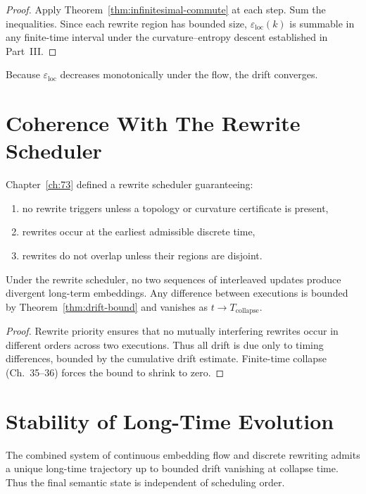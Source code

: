 \begin{proof}
Apply Theorem~\ref{thm:infinitesimal-commute} at each step.  
Sum the inequalities.  
Since each rewrite region has bounded size,  
$\varepsilon_{\mathrm{loc}}(k)$ is summable in any finite-time interval  
under the curvature–entropy descent established in Part~III.  
\end{proof}

Because $\varepsilon_{\mathrm{loc}}$ decreases monotonically under the flow,  
the drift converges.

\section{Coherence With The Rewrite Scheduler}

Chapter~\ref{ch:73} defined a rewrite scheduler guaranteeing:

\begin{enumerate}
\item no rewrite triggers unless a topology or curvature certificate is present,
\item rewrites occur at the earliest admissible discrete time,
\item rewrites do not overlap unless their regions are disjoint.
\end{enumerate}

\begin{theorem}
\label{thm:scheduler-consistency}
Under the rewrite scheduler,  
no two sequences of interleaved updates produce divergent long-term embeddings.  
Any difference between executions is bounded by Theorem~\ref{thm:drift-bound}
and vanishes as $t \to T_{\mathrm{collapse}}$.
\end{theorem}

\begin{proof}
Rewrite priority ensures that no mutually interfering rewrites  
occur in different orders across two executions.  
Thus all drift is due only to timing differences,  
bounded by the cumulative drift estimate.  
Finite-time collapse (Ch.~35--36) forces the bound to shrink to zero.  
\end{proof}

\section{Stability of Long-Time Evolution}

\begin{theorem}
\label{thm:global-consistency}
The combined system of continuous embedding flow and discrete rewriting  
admits a unique long-time trajectory up to bounded drift  
vanishing at collapse time.  
Thus the final semantic state is independent of scheduling order.
\end{theorem}

